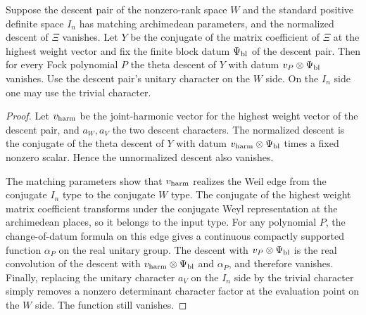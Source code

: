 \begin{lemma}
\label{lem:c-false-bottom-polynomials}
\emitthmsource
Suppose the descent pair of the nonzero-rank space $W$ and the standard positive definite space $I_n$ has matching archimedean parameters, and the normalized descent of $\Xi$ vanishes. Let $Y$ be the conjugate of the matrix coefficient of $\Xi$ at the highest weight vector and fix the finite block datum $\Psi_{\rm bl}$ of the descent pair. Then for every Fock polynomial $P$ the theta descent of $Y$ with datum $v_P\otimes\Psi_{\rm bl}$ vanishes. Use the descent pair's unitary character on the $W$ side. On the $I_n$ side one may use the trivial character.
\end{lemma}

\begin{proof}
Let $v_{\rm harm}$ be the joint-harmonic vector for the highest weight vector of the descent pair, and $a_W,a_V$ the two descent characters. The normalized descent is the conjugate of the theta descent of $Y$ with datum $v_{\rm harm}\otimes\Psi_{\rm bl}$ times a fixed nonzero scalar. Hence the unnormalized descent also vanishes.

The matching parameters show that $v_{\rm harm}$ realizes the Weil edge from the conjugate $I_n$ type to the conjugate $W$ type. The conjugate of the highest weight matrix coefficient transforms under the conjugate Weyl representation at the archimedean places, so it belongs to the input type. For any polynomial $P$, the change-of-datum formula on this edge gives a continuous compactly supported function $\alpha_P$ on the real unitary group. The descent with $v_P\otimes\Psi_{\rm bl}$ is the real convolution of the descent with $v_{\rm harm}\otimes\Psi_{\rm bl}$ and $\alpha_P$, and therefore vanishes. Finally, replacing the unitary character $a_V$ on the $I_n$ side by the trivial character simply removes a nonzero determinant character factor at the evaluation point on the $W$ side. The function still vanishes.
\end{proof}

